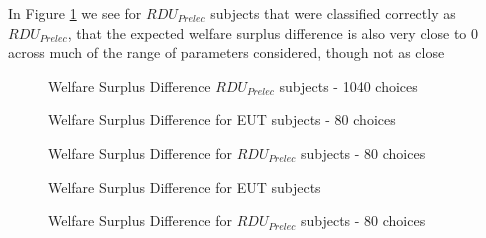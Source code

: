 \documentclass[../main.tex]{subfiles}
\begin{document}
In Figure \ref{fig:HNG_wel_pre} we see for $\mathit{RDU_{Prelec}}$ subjects that were classified correctly as $\mathit{RDU_{Prelec}}$, that the expected welfare surplus difference is also very close to 0 across much of the range of parameters considered, though not as close 

\begin{figure}[hb!]
	\center
	\caption{Welfare Surplus Difference $\mathit{RDU_{Prelec}}$ subjects - 1040 choices}
	\label{fig:HNG_wel_pre}
\end{figure}


\begin{figure}[htp!]
	\center
	\caption{Welfare Surplus Difference for EUT subjects - 80 choices}
	\label{fig:HNG1_def_wel_eut}
\end{figure}

\begin{figure}[hbp!]
	\center
	\caption{Welfare Surplus Difference for $\mathit{RDU_{Prelec}}$ subjects - 80 choices}
	\label{fig:HNG1_def_wel_pre}
\end{figure}

\begin{figure}[htp!]
	\center
	\caption{Welfare Surplus Difference for EUT subjects}
	\label{fig:exwel-eut}
\end{figure}

\begin{figure}[hbp!]
	\center
	\caption{Welfare Surplus Difference for $\mathit{RDU_{Prelec}}$ subjects - 80 choices}
	\label{fig:exwel-pre}
\end{figure}
\end{document}
